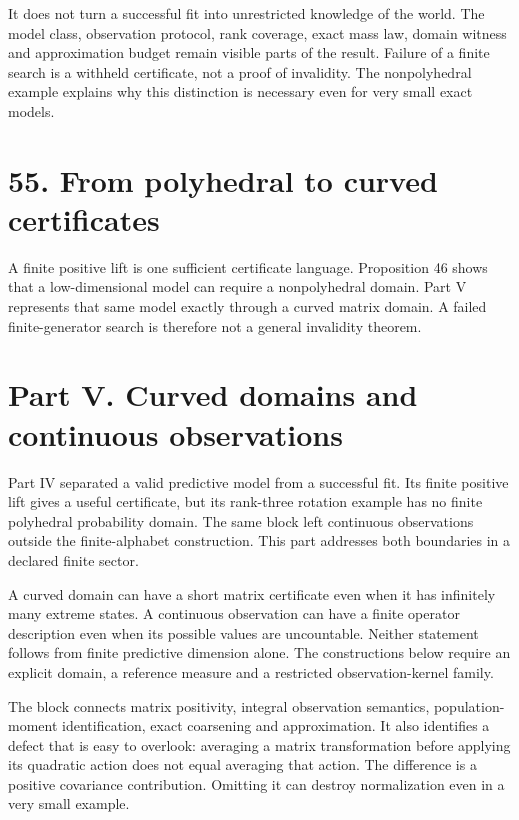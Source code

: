 \documentclass[11pt,letterpaper]{article}
\begin{document}
It does not turn a successful fit into unrestricted knowledge of the
world. The model class, observation protocol, rank coverage, exact mass
law, domain witness and approximation budget remain visible parts of the
result. Failure of a finite search is a withheld certificate, not a
proof of invalidity. The nonpolyhedral example explains why this
distinction is necessary even for very small exact models.

\section{55. From polyhedral to curved
certificates}\label{from-polyhedral-to-curved-certificates}

A finite positive lift is one sufficient certificate language.
Proposition 46 shows that a low-dimensional model can require a
nonpolyhedral domain. Part V represents that same model exactly through
a curved matrix domain. A failed finite-generator search is therefore
not a general invalidity theorem.

\newpage

\section{Part V. Curved domains and continuous
observations}\label{part-v.-curved-domains-and-continuous-observations}

Part IV separated a valid predictive model from a successful fit. Its
finite positive lift gives a useful certificate, but its rank-three
rotation example has no finite polyhedral probability domain. The same
block left continuous observations outside the finite-alphabet
construction. This part addresses both boundaries in a declared finite
sector.

A curved domain can have a short matrix certificate even when it has
infinitely many extreme states. A continuous observation can have a
finite operator description even when its possible values are
uncountable. Neither statement follows from finite predictive dimension
alone. The constructions below require an explicit domain, a reference
measure and a restricted observation-kernel family.

The block connects matrix positivity, integral observation semantics,
population-moment identification, exact coarsening and approximation. It
also identifies a defect that is easy to overlook: averaging a matrix
transformation before applying its quadratic action does not equal
averaging that action. The difference is a positive covariance
contribution. Omitting it can destroy normalization even in a very small
example.
\end{document}
